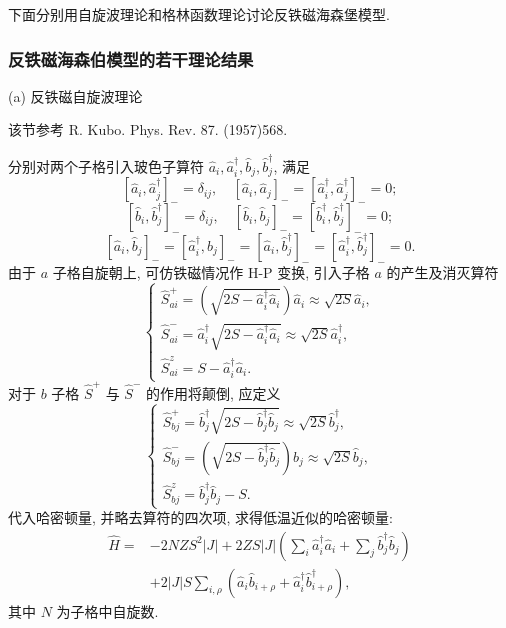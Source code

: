 下面分别用自旋波理论和格林函数理论讨论反铁磁海森堡模型.

\subsubsection{反铁磁海森伯模型的若干理论结果}
(a) 反铁磁自旋波理论

该节参考 R. Kubo. Phys. Rev. 87. (1957)568.

分别对两个子格引入玻色子算符 $\hat{a}^{}_{i}, \hat{a}_{i}^{\dagger}, \hat{b}^{}_{j}, \hat{b}_{j}^{\dagger}$, 满足
\begin{equation}
\left[\hat{a}^{}_{i}, \hat{a}_{j}^{\dagger}\right]_-=\delta_{i j}, \quad\left[\hat{a}_{i}, \hat{a}_{j}\right]_-=\left[\hat{a}_{i}^{\dagger}, \hat{a}_{j}^{\dagger}\right]_-=0;
\end{equation}
\begin{equation}
\left[\hat{b}^{}_{i}, \hat{b}_{j}^{\dagger}\right]_-=\delta_{i j}, \quad\left[\hat{b}_{i}, \hat{b}_{j}\right]_-=\left[\hat{b}_{i}^{\dagger}, \hat{b}_{j}^{\dagger}\right]_-=0;
\end{equation}
\begin{equation}
\left[\hat{a}^{}_{i}, \hat{b}_{j}^{}\right]_-=\left[\hat{a}^{\dagger}_{i}, \hat{b}^{}_{j}\right]_-=\left[\hat{a}_{i}^{}, \hat{b}_{j}^{\dagger}\right]_-=\left[\hat{a}_{i}^{\dagger}, \hat{b}_{j}^{\dagger}\right]_-=0.
\end{equation}
由于 $a$ 子格自旋朝上, 可仿铁磁情况作 H-P 变换, 引入子格 $a$ 的产生及消灭算符
\begin{equation}
\left\{\begin{array}{l}
\hat{S}_{a i}^{+}=\left(\sqrt{2 S-\hat a_{i}^{\dagger} \hat a^{}_{i}}\right) \hat a^{}_{i}\approx \sqrt{2 S} \hat{a}_{i},\\
\hat{S}_{a i}^{-}=\hat a_{i}^{\dagger} \sqrt{2 S-\hat a_{i}^{\dagger} \hat a^{}_{i}} \approx \sqrt{2 S} \hat{a}_{i}^{\dagger} ,\\
\hat{S}_{a i}^{z}=S-\hat a_{i}^{\dagger} \hat a^{}_{i}.
\end{array}\right.
\end{equation}
对于 $b$ 子格 $\hat{S}^{+}$ 与 $\hat{S}^{-}$ 的作用将颠倒, 应定义
\begin{equation}
\left\{\begin{array}{l}
\hat{S}_{b j}^{+}=\hat b_{j}^{\dagger} \sqrt{2 S-\hat b_{j}^{\dagger} \hat b^{}_{j}}\approx \sqrt{2 S} \hat{b}_{j}^{\dagger}, \\
\hat{S}_{b j}^{-}=\left(\sqrt{2 S-\hat b_{j}^{\dagger} \hat b^{}_{j}}\right) \hat b^{}_{j}\approx \sqrt{2 S} \hat{b}_{j}, \\
\hat{S}_{b j}^{z}=\hat b_{j}^{\dagger} \hat b^{}_{j}-S.
\end{array}\right.
\end{equation}
代入哈密顿量, 并略去算符的四次项, 求得低温近似的哈密顿量:
\begin{align}
\hat H=&-2 N Z S^{2}|J|+2 Z S|J|\left(\sum_{i} \hat a_{i}^{\dagger} \hat a^{}_{i}+\sum_{j} \hat b_{j}^{\dagger} \hat b^{}_{j}\right)\nonumber\\
&+2|J| S \sum_{i, \rho}\left(\hat a^{}_{i} \hat b^{}_{i+\rho}+\hat a_{i}^{\dagger} \hat b_{i+\rho}^{\dagger}\right),
\end{align}
其中 $N$ 为子格中自旋数. 


